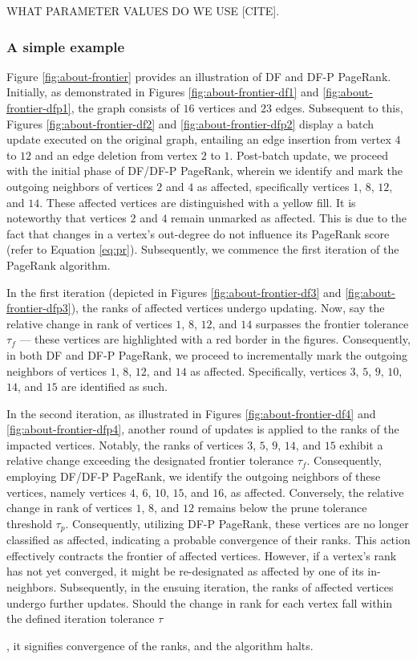 WHAT PARAMETER VALUES DO WE USE [CITE].


\subsubsection{A simple example}

Figure \ref{fig:about-frontier} provides an illustration of DF and DF-P PageRank. Initially, as demonstrated in Figures \ref{fig:about-frontier-df1} and \ref{fig:about-frontier-dfp1}, the graph consists of $16$ vertices and $23$ edges. Subsequent to this, Figures \ref{fig:about-frontier-df2} and \ref{fig:about-frontier-dfp2} display a batch update executed on the original graph, entailing an edge insertion from vertex $4$ to $12$ and an edge deletion from vertex $2$ to $1$. Post-batch update, we proceed with the initial phase of DF/DF-P PageRank, wherein we identify and mark the outgoing neighbors of vertices $2$ and $4$ as affected, specifically vertices $1$, $8$, $12$, and $14$. These affected vertices are distinguished with a yellow fill. It is noteworthy that vertices $2$ and $4$ remain unmarked as affected. This is due to the fact that changes in a vertex's out-degree do not influence its PageRank score (refer to Equation \ref{eq:pr}). Subsequently, we commence the first iteration of the PageRank algorithm.

In the first iteration (depicted in Figures \ref{fig:about-frontier-df3} and \ref{fig:about-frontier-dfp3}), the ranks of affected vertices undergo updating. Now, say the relative change in rank of vertices $1$, $8$, $12$, and $14$ surpasses the frontier tolerance $\tau_f$ --- these vertices are highlighted with a red border in the figures. Consequently, in both DF and DF-P PageRank, we proceed to incrementally mark the outgoing neighbors of vertices $1$, $8$, $12$, and $14$ as affected. Specifically, vertices $3$, $5$, $9$, $10$, $14$, and $15$ are identified as such.



In the second iteration, as illustrated in Figures \ref{fig:about-frontier-df4} and \ref{fig:about-frontier-dfp4}, another round of updates is applied to the ranks of the impacted vertices. Notably, the ranks of vertices $3$, $5$, $9$, $14$, and $15$ exhibit a relative change exceeding the designated frontier tolerance $\tau_f$. Consequently, employing DF/DF-P PageRank, we identify the outgoing neighbors of these vertices, namely vertices $4$, $6$, $10$, $15$, and $16$, as affected. Conversely, the relative change in rank of vertices $1$, $8$, and $12$ remains below the prune tolerance threshold $\tau_p$. Consequently, utilizing DF-P PageRank, these vertices are no longer classified as affected, indicating a probable convergence of their ranks. This action effectively contracts the frontier of affected vertices. However, if a vertex's rank has not yet converged, it might be re-designated as affected by one of its in-neighbors. Subsequently, in the ensuing iteration, the ranks of affected vertices undergo further updates. Should the change in rank for each vertex fall within the defined iteration tolerance $\tau$, it signifies convergence of the ranks, and the algorithm halts.

